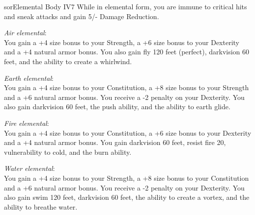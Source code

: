\begin{spellcard}{sor}{Elemental Body IV}{7}
  While in elemental form, you are immune to critical hits and sneak attacks and gain 5/- Damage Reduction.

  \vfill{}
  \emph{Air elemental}:\\
  You gain a +4 size bonus to your Strength,
  a +6 size bonus to your Dexterity and a +4 natural armor bonus.
  You also gain fly 120 feet (perfect), darkvision 60 feet, and the ability to create a whirlwind.

  \emph{Earth elemental}:\\
  You gain a +4 size bonus to your Constitution,
  a +8 size bonus to your Strength and a +6 natural armor bonus.
  You receive a -2 penalty on your Dexterity.
  You also gain darkvision 60 feet, the push ability, and the ability to earth glide.

  \emph{Fire elemental}:\\
  You gain a +4 size bonus to your Constitution,
  a +6 size bonus to your Dexterity and a +4 natural armor bonus.
  You gain darkvision 60 feet, resist fire 20, vulnerability to cold, and the burn ability.

  \emph{Water elemental}:\\
  You gain a +4 size bonus to your Strength,
  a +8 size bonus to your Constitution and a +6 natural armor bonus.
  You receive a -2 penalty on your Dexterity.
  You also gain swim 120 feet, darkvision 60 feet, the ability to create a vortex, and the ability to breathe water.
\end{spellcard}
